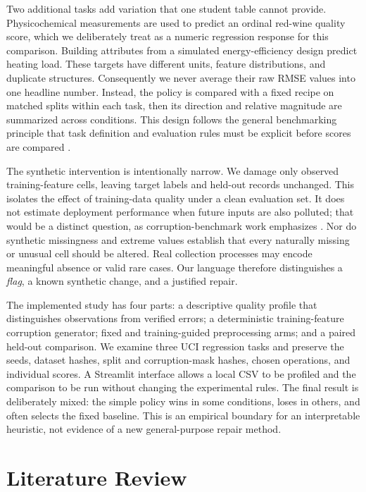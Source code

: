\documentclass[conference]{IEEEtran}
\begin{document}
Two additional tasks add variation that one student table cannot provide. Physicochemical measurements are used to predict an ordinal red-wine quality score, which we deliberately treat as a numeric regression response for this comparison. Building attributes from a simulated energy-efficiency design predict heating load. These targets have different units, feature distributions, and duplicate structures. Consequently we never average their raw RMSE values into one headline number. Instead, the policy is compared with a fixed recipe on matched splits within each task, then its direction and relative magnitude are summarized across conditions. This design follows the general benchmarking principle that task definition and evaluation rules must be explicit before scores are compared \cite{Bischl2021}.

The synthetic intervention is intentionally narrow. We damage only observed training-feature cells, leaving target labels and held-out records unchanged. This isolates the effect of training-data quality under a clean evaluation set. It does not estimate deployment performance when future inputs are also polluted; that would be a distinct question, as corruption-benchmark work emphasizes \cite{Schelter2021,Mohammed2025}. Nor do synthetic missingness and extreme values establish that every naturally missing or unusual cell should be altered. Real collection processes may encode meaningful absence or valid rare cases. Our language therefore distinguishes a \emph{flag}, a known synthetic change, and a justified repair.

The implemented study has four parts: a descriptive quality profile that distinguishes observations from verified errors; a deterministic training-feature corruption generator; fixed and training-guided preprocessing arms; and a paired held-out comparison. We examine three UCI regression tasks and preserve the seeds, dataset hashes, split and corruption-mask hashes, chosen operations, and individual scores. A Streamlit interface allows a local CSV to be profiled and the comparison to be run without changing the experimental rules. The final result is deliberately mixed: the simple policy wins in some conditions, loses in others, and often selects the fixed baseline. This is an empirical boundary for an interpretable heuristic, not evidence of a new general-purpose repair method.

\section{Literature Review}
\end{document}
